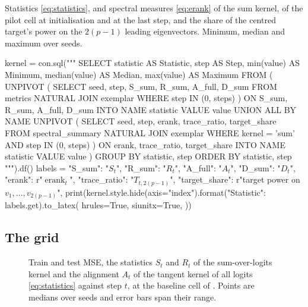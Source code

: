 \documentclass[a4paper,11pt]{article} %
\begin{document}
\begin{table}[t]
  \centering
  \caption{Statistics \eqref{eq:statistics}, and spectral measures
    \eqref{eq:erank} of the sum kernel, of the pilot cell at
    initialisation and at the last step, and the share of the centred target's
    power on the $2(p-1)$ leading eigenvectors. Minimum, median and maximum over
  seeds.}
  \label{tab:kernel}
\begin{pycode}
kernel = con.sql("""
    SELECT statistic AS Statistic, step AS Step, min(value) AS Minimum,
        median(value) AS Median, max(value) AS Maximum
    FROM (
        UNPIVOT (
            SELECT seed, step, S_sum, R_sum, A_full, D_sum
            FROM metrics NATURAL JOIN exemplar
            WHERE step IN (0, steps)
        ) ON S_sum, R_sum, A_full, D_sum INTO NAME statistic VALUE value
        UNION ALL BY NAME
        UNPIVOT (
            SELECT seed, step, erank, trace_ratio, target_share
            FROM spectral_summary NATURAL JOIN exemplar
            WHERE kernel = 'sum' AND step IN (0, steps)
        ) ON erank, trace_ratio, target_share INTO NAME statistic VALUE value
    )
    GROUP BY statistic, step
    ORDER BY statistic, step
""").df()
labels = {
    "S_sum": "$S_t$",
    "R_sum": "$R_t$",
    "A_full": "$A_t$",
    "D_sum": "$D_t$",
    "erank": r"$\operatorname{erank}_t$",
    "trace_ratio": "$T_{t,2(p-1)}$",
    "target_share": r"target power on $v_1,\dots,v_{2(p-1)}$",
}
print(kernel.style.hide(axis="index").format({"Statistic": labels.get}).to_latex(
    hrules=True, siunitx=True,
))
\end{pycode}
\end{table}

\subsection{The grid}


\begin{figure}[t]
  \centering
{}
  \caption{Train and test MSE, the statistics $S_t$ and $R_t$ of the
    sum-over-logits kernel and the alignment $A_t$ of the tangent kernel of all
    logits \eqref{eq:statistics} against step $t$, at the baseline cell of
    \citet{kumarGrokkingTransitionLazy2024}. Points are medians over
   seeds and error bars span their range.}
  \label{fig:dynamics}
\end{figure}
\end{document}
